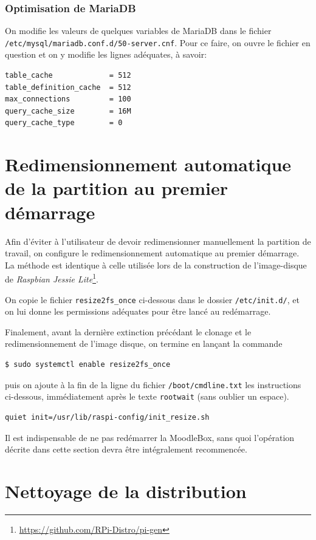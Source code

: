 \documentclass[11pt]{article}
\begin{document}
\subsubsection{Optimisation de MariaDB}

On modifie les valeurs de quelques variables de MariaDB dans le fichier \lstinline{/etc/mysql/mariadb.conf.d/50-server.cnf}. Pour ce faire, on ouvre le fichier en question
et on y modifie les lignes adéquates, à savoir:
\begin{lstlisting}[language=bash]
table_cache             = 512
table_definition_cache  = 512
max_connections         = 100
query_cache_size        = 16M
query_cache_type        = 0
\end{lstlisting}

\section{Redimensionnement automatique de la partition au premier démarrage}

Afin d'éviter à l'utilisateur de devoir redimensionner manuellement la partition de travail, on configure le redimensionnement automatique au premier démarrage. La méthode est identique à celle utilisée lors de la construction de l'image-disque de \emph{Raspbian Jessie Lite}\footnote{\url{https://github.com/RPi-Distro/pi-gen}}.

On copie le fichier \lstinline{resize2fs_once} ci-dessous dans le dossier \lstinline{/etc/init.d/}, et on lui donne les permissions adéquates pour être lancé au redémarrage.


Finalement, avant la dernière extinction précédant le clonage et le redimensionnement de l'image disque, on termine en lançant la commande
\begin{lstlisting}[language=bash]
$ sudo systemctl enable resize2fs_once
\end{lstlisting}
puis on ajoute à la fin de la ligne du fichier \lstinline{/boot/cmdline.txt} les instructions ci-dessous, immédiatement après le texte \lstinline{rootwait} (sans oublier un espace).
\begin{lstlisting}[language=bash]
quiet init=/usr/lib/raspi-config/init_resize.sh
\end{lstlisting}

Il est indispensable de ne pas redémarrer la MoodleBox, sans quoi l'opération décrite dans cette section devra être intégralement recommencée.

\section{Nettoyage de la distribution}
\end{document}
